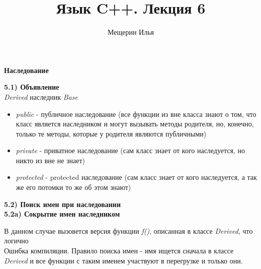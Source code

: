 \documentclass{article}
\title{Язык C++. Лекция 6}
\author{Мещерин Илья}
\date{\DTMdate{2018-11-05}}
\begin{document}
\maketitle

\begin{center}
	\begin{large}
		\textbf{Наследование}
	\end{large}
\end{center}

\noindent \textbf{5.1) Объявление}\\
\textit{Derived} наследник \textit{Base}

\begin{itemize}
	\item \textit{public} - публичное наследование (все функции из вне класса знают о том, что класс является наследником и могут вызывать методы родителя, но, конечно, только те методы, которые у родителя являются публичными)
	\item \textit{private} - приватное наследование (сам класс знает от кого наследуется, но никто из вне не знает)
	\item \textit{protected} - protected наследование (сам класс знает от кого наследуется, а так же его потомки то же об этом знают)
\end{itemize}
\textbf{5.2) Поиск имен при наследовании}\\
\textbf{5.2a) Сокрытие имен наследником}

В данном случае вызовется версия функции \textit{f()}, описанная в классе \textit{Derived}, что логично\\

Ошибка компиляции. Правило поиска имен - имя ищется сначала в классе \textit{Derived} и все функции с таким именем участвуют в перегрузке и только они.
\end{document}
